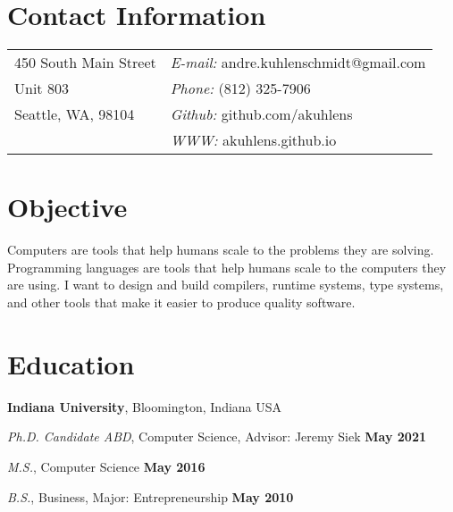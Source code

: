 \documentclass[resmargin,line]{res}
\newenvironment{list1}{
  \begin{list}{\ding{113}}{%
      \setlength{\itemsep}{0in}
      \setlength{\parsep}{0in} \setlength{\parskip}{0in}
      \setlength{\topsep}{0in} \setlength{\partopsep}{0in} 
      \setlength{\leftmargin}{0.17in}}}{\end{list}}
\begin{document}

\begin{resume}
\section{\sc Contact Information}
\vspace{.05in}
\begin{tabular}{@{}p{2in}p{4in}}
450 South Main Street      & {\it E-mail:} andre.kuhlenschmidt@gmail.com \\
Unit 803                           & {\it Phone:}  (812) 325-7906 \\
Seattle, WA, 98104          & {\it Github:} github.com/akuhlens  \\       
                                       & {\it WWW:} akuhlens.github.io \\     
\end{tabular}

\section{\sc Objective }
Computers are tools that help humans scale to the problems they are
solving. Programming languages are tools that help humans scale to the
computers they are using. I want to design and build compilers,
runtime systems, type systems, and other tools that make it easier
to produce quality software. 

\section{\sc Education}
{\bf Indiana University},
Bloomington, Indiana USA\\
\vspace*{-.15in}
\begin{list1}
\item[] {\em Ph.D. Candidate ABD}, Computer Science, Advisor: Jeremy Siek \hfill{} {\bf May 2021}
\item[] {\em M.S.}, Computer Science  \hfill {\bf May 2016}
\item[] {\em B.S.}, Business, Major: Entrepreneurship \hfill{} {\bf May 2010}
\end{list1}



\end{resume}
\end{document}

